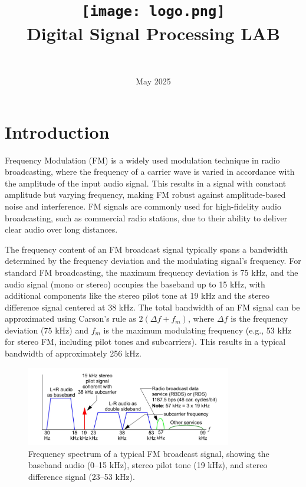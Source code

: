 \documentclass{article}
\title{
    \texttt{[image: logo.png]} \\ 
    Digital Signal Processing LAB \\ \exerciseset
}
\author{\FirstAuthor \\ \SecondAuthor}
\date{May 2025}
\begin{document}
\maketitle

\section*{Introduction}
Frequency Modulation (FM) is a widely used modulation technique in radio broadcasting, where the frequency of a carrier wave is varied in accordance with the amplitude of the input audio signal. This results in a signal with constant amplitude but varying frequency, making FM robust against amplitude-based noise and interference. FM signals are commonly used for high-fidelity audio broadcasting, such as commercial radio stations, due to their ability to deliver clear audio over long distances.

The frequency content of an FM broadcast signal typically spans a bandwidth determined by the frequency deviation and the modulating signal's frequency. For standard FM broadcasting, the maximum frequency deviation is 75 kHz, and the audio signal (mono or stereo) occupies the baseband up to 15 kHz, with additional components like the stereo pilot tone at 19 kHz and the stereo difference signal centered at 38 kHz. The total bandwidth of an FM signal can be approximated using Carson's rule as $2(\Delta f + f_m)$, where $\Delta f$ is the frequency deviation (75 kHz) and $f_m$ is the maximum modulating frequency (e.g., 53 kHz for stereo FM, including pilot tones and subcarriers). This results in a typical bandwidth of approximately 256 kHz.

\begin{figure}[h]
\centering
\includegraphics[width=0.8\textwidth]{fm_channel_freq_content.png}
\caption{Frequency spectrum of a typical FM broadcast signal, showing the baseband audio (0--15 kHz), stereo pilot tone (19 kHz), and stereo difference signal (23--53 kHz).}
\label{fig:fm_spectrum}
\end{figure}
\end{document}
